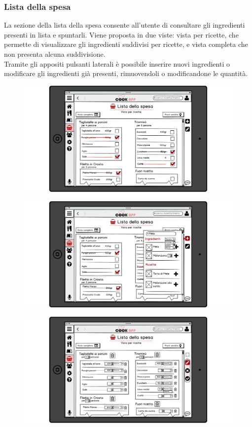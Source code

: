 \subsubsection{Lista della spesa}
La sezione della lista della spesa consente
all'utente di consultare gli ingredienti presenti in lista e
spuntarli. Viene proposta in due viste: vista per ricette, che permette
di visualizzare gli ingredienti suddivisi per ricette, e vista
completa che non presenta alcuna suddivisione.\\
Tramite gli appositi pulsanti laterali è possibile inserire nuovi
ingredienti o modificare gli ingredienti già presenti, rimuovendoli o
modificandone le quantità.
\begin{figure}[H]
	\centering
	\includegraphics[width=0.95\linewidth]{img/mockup/spesa.png}
\end{figure}
\begin{figure}[H]
	\centering
	\includegraphics[width=0.95\linewidth]{img/mockup/spesa-add.png}
\end{figure}
\begin{figure}[H]
	\centering
	\includegraphics[width=0.95\linewidth]{img/mockup/spesa-edit.png}
\end{figure}
